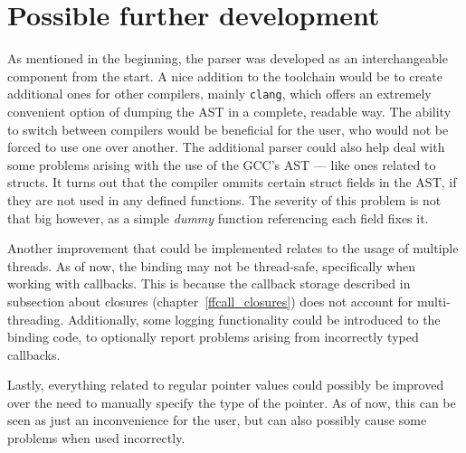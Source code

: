 \documentclass[polish, english]{iithesis}
\begin{document}
  \section{Possible further development}
    As mentioned in the beginning, the parser was developed as an interchangeable component from the start.
    A nice addition to the toolchain would be to create additional ones for other compilers, mainly \texttt{clang}, which offers an extremely convenient option of dumping the AST in a complete, readable way.
    The ability to switch between compilers would be beneficial for the user, who would not be forced to use one over another.
    The additional parser could also help deal with some problems arising with the use of the GCC's AST --- like ones related to structs.
    It turns out that the compiler ommits certain struct fields in the AST, if they are not used in any defined functions.
    The severity of this problem is not that big however, as a simple \textit{dummy} function referencing each field fixes it.

    Another improvement that could be implemented relates to the usage of multiple threads.
    As of now, the binding may not be thread-safe, specifically when working with callbacks.
    This is because the callback storage described in subsection about closures (chapter~\ref{ffcall_closures}) does not account for multi-threading.
    Additionally, some logging functionality could be introduced to the binding code, to optionally report problems arising from incorrectly typed callbacks.

    Lastly, everything related to regular pointer values could possibly be improved over the need to manually specify the type of the pointer.
    As of now, this can be seen as just an inconvenience for the user, but can also possibly cause some problems when used incorrectly.
\end{document}
